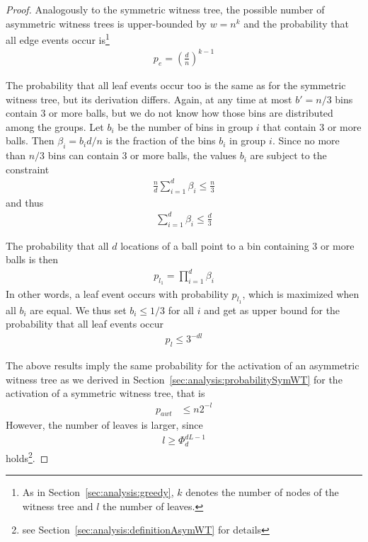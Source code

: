 \documentclass[a4paper,12pt]{article}
\begin{document}
\begin{proof}
Analogously to the symmetric witness tree, the possible number of asymmetric witness trees is upper-bounded by $w=n^k$ and the probability that all edge events occur is\footnote{As in Section~\ref{sec:analysis:greedy}, $k$ denotes the number of nodes of the witness tree and $l$ the number of leaves.} 
\begin{align*}
p_e = \left(\frac{d}{n}\right)^{k-1}
\end{align*}

The probability that all leaf events occur too is the same as for the symmetric witness tree, but its derivation differs. Again, at any time at most $b'=n/3$ bins contain 3 or more balls, but we do not know how those bins are distributed among the groups. Let $b_i$ be the number of bins in group $i$ that contain 3 or more balls. Then $\beta_i = b_i d/ n$ is the fraction of the bins $b_i$ in group $i$. Since no more than $n/3$ bins can contain 3 or more balls, the values $b_i$ are subject to the constraint
\begin{align*}
\frac{n}{d}\sum_{i=1}^d \beta_i \leq \frac{n}{3}
\end{align*}
and thus 
\begin{align*}
\sum_{i=1}^d \beta_i \leq \frac{d}{3}
\end{align*}

The probability that all $d$ locations of a ball point to a bin containing 3 or more balls is then 
\begin{align*}
p_{l_1} = \prod_{i=1}^{d} \beta_i
\end{align*}
In other words, a leaf event occurs with probability $p_{l_1}$, which is maximized when all $b_i$ are equal. We thus set $b_i \leq 1/3$ for all $i$ and get as upper bound for the probability that all leaf events occur 
\begin{align*}
p_l \leq 3^{-d l}
\end{align*}

The above results imply the same probability for the activation of an asymmetric witness tree as we derived in Section~\ref{sec:analysis:probabilitySymWT} for the activation of a symmetric witness tree, that is
\begin{align*}
p_{awt} &\leq n  2^{-l}
\end{align*}
However, the number of leaves is larger, since 
\begin{align*}
l \geq \Phi_d^{d L -1}
\end{align*}
holds\footnote{see Section~\ref{sec:analysis:definitionAsymWT} for details}.


\end{proof}
\end{document}
